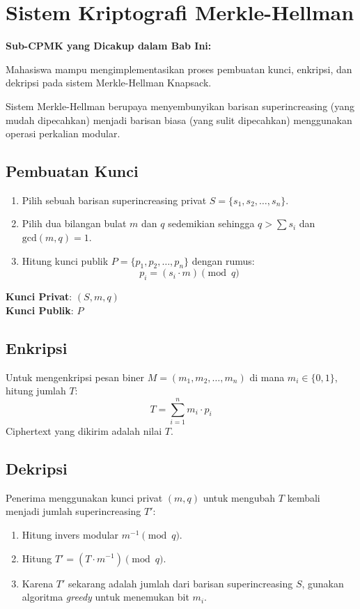 ﻿%
\section{Sistem Kriptografi Merkle-Hellman}

\vspace{0.5cm}
\noindent\colorbox{blue!10}{\parbox{\dimexpr\textwidth-2\fboxsep}{\textbf{\large Sub-CPMK yang Dicakup dalam Bab Ini:}}}
\vspace{0.3cm}
\begin{itemize}[leftmargin=*, itemsep=5pt]
Mahasiswa mampu mengimplementasikan proses pembuatan kunci, enkripsi, dan dekripsi pada sistem Merkle-Hellman Knapsack.
\end{itemize}
\vspace{0.5cm}

Sistem Merkle-Hellman berupaya menyembunyikan barisan superincreasing (yang mudah dipecahkan) menjadi barisan biasa (yang sulit dipecahkan) menggunakan operasi perkalian modular.

\subsection{Pembuatan Kunci}
\begin{enumerate}
    \item Pilih sebuah barisan superincreasing privat $S = \{s_1, s_2, \dots, s_n\}$.
    \item Pilih dua bilangan bulat $m$ dan $q$ sedemikian sehingga $q > \sum s_i$ dan $\text{gcd}(m, q) = 1$.
    \item Hitung kunci publik $P = \{p_1, p_2, \dots, p_n\}$ dengan rumus:
    \[ p_i = (s_i \cdot m) \pmod{q} \]
\end{enumerate}
\textbf{Kunci Privat}: $(S, m, q)$ \\
\textbf{Kunci Publik}: $P$

\subsection{Enkripsi}
Untuk mengenkripsi pesan biner $M = (m_1, m_2, \dots, m_n)$ di mana $m_i \in \{0, 1\}$, hitung jumlah $T$:
\[ T = \sum_{i=1}^{n} m_i \cdot p_i \]
Ciphertext yang dikirim adalah nilai $T$.

\subsection{Dekripsi}
Penerima menggunakan kunci privat $(m, q)$ untuk mengubah $T$ kembali menjadi jumlah superincreasing $T'$:
\begin{enumerate}
    \item Hitung invers modular $m^{-1} \pmod{q}$.
    \item Hitung $T' = (T \cdot m^{-1}) \pmod{q}$.
    \item Karena $T'$ sekarang adalah jumlah dari barisan superincreasing $S$, gunakan algoritma \textit{greedy} untuk menemukan bit $m_i$.
\end{enumerate}

